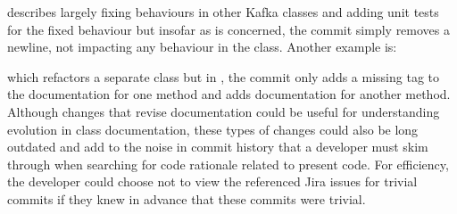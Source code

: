 \begin{center}
\end{center}

describes largely fixing behaviours in other Kafka classes and adding unit tests for the fixed behaviour but insofar as  is concerned, the commit simply removes a newline, not impacting any behaviour in the class. 
Another example is: 

\begin{center}
\end{center}

which refactors a separate class but in , the commit only adds a missing  tag to the documentation for one method and adds documentation for another method.
Although changes that revise documentation could be useful for understanding evolution in class documentation, 
these types of changes could also be long outdated and add to the noise in commit history that a developer must skim through when searching for code rationale related to present code.
For efficiency, the developer could choose not to view the referenced Jira issues for trivial commits if they knew in advance that these commits were trivial.

